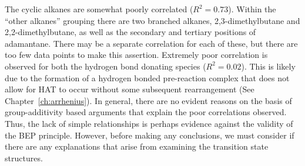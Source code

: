 \begin{doublespace}
The cyclic alkanes are somewhat poorly correlated ($R^2 = 0.73$). Within the
``other alkanes'' grouping there are two branched alkanes, 2,3-dimethylbutane
and 2,2-dimethylbutane, as well as the secondary and tertiary  positions
of adamantane. There may be a separate correlation for each of these, but
there are too few data points to make this assertion. Extremely poor correlation
is observed for both the hydrogen bond donating species ($R^2 = 0.02$). This is
likely due to the formation of a hydrogen bonded pre-reaction complex that does
not allow for HAT to occur without some subsequent rearrangement (See
Chapter~\ref{ch:arrhenius}). In general, there are no evident reasons on the
basis of group-additivity based arguments that explain the poor correlations
observed. Thus, the lack of simple relationships is perhaps evidence against the
validity of the BEP principle. However, before making any conclusions, we must
consider if there are any explanations that arise from examining the transition
state structures.


\end{doublespace}
